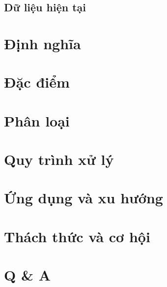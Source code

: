 \subsection{ Dữ liệu hiện tại }
\section{ Định nghĩa }
\section{ Đặc điểm }
\section{ Phân loại }
\section{ Quy trình xử lý }
\section{ Ứng dụng và xu hướng }
\section{ Thách thức và cơ hội }
\section{ Q \& A }


